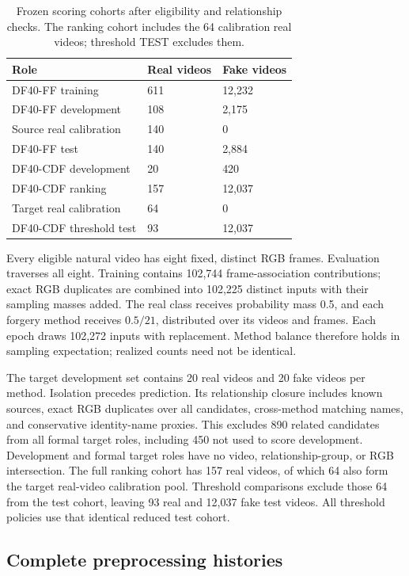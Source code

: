 \documentclass{ieeeaccess}
\begin{document}
\begin{table}[t]
\centering
\caption{Frozen scoring cohorts after eligibility and relationship checks. The ranking cohort includes the 64 calibration real videos; threshold TEST excludes them.}
\label{tab:d-cohorts}
\setlength{\tabcolsep}{5pt}
\footnotesize
\begin{tabular}{lll}
\toprule
Role & Real videos & Fake videos \\
\midrule
DF40-FF training & 611 & 12,232 \\
DF40-FF development & 108 & 2,175 \\
Source real calibration & 140 & 0 \\
DF40-FF test & 140 & 2,884 \\
DF40-CDF development & 20 & 420 \\
DF40-CDF ranking & 157 & 12,037 \\
Target real calibration & 64 & 0 \\
DF40-CDF threshold test & 93 & 12,037 \\
\bottomrule
\end{tabular}
\end{table}

Every eligible natural video has eight fixed, distinct RGB frames.
Evaluation traverses all eight. Training contains 102,744
frame-association contributions; exact RGB duplicates are combined into
102,225 distinct inputs with their sampling masses added. The real class
receives probability mass 0.5, and each forgery method receives
\(0.5/21\), distributed over its videos and frames. Each epoch draws
102,272 inputs with replacement. Method balance therefore holds in
sampling expectation; realized counts need not be identical.

The target development set contains 20 real videos and 20 fake videos
per method. Isolation precedes prediction. Its relationship closure
includes known sources, exact RGB duplicates over all candidates,
cross-method matching names, and conservative identity-name proxies.
This excludes 890 related candidates from all formal target roles,
including 450 not used to score development. Development and formal
target roles have no video, relationship-group, or RGB intersection. The
full ranking cohort has 157 real videos, of which 64 also form the
target real-video calibration pool. Threshold comparisons exclude those
64 from the test cohort, leaving 93 real and 12,037 fake test videos.
All threshold policies use that identical reduced test cohort.

\subsection{Complete preprocessing
histories}\label{complete-preprocessing-histories}
\end{document}

